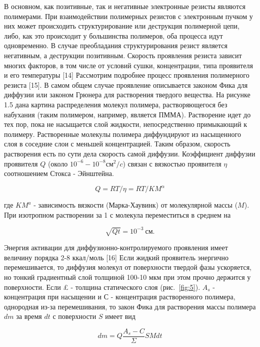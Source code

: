 В основном, как позитивные, так и негативные электронные резисты являются полимерами. При взаимодействии полимерных резистов с электронным пучком у них может происходить структурирование или деструкция полимерной цепи, либо, как это происходит у большинства полимеров, оба процесса идут одновременно. В случае преобладания структурирования резист является негативным, а деструкции позитивным. Скорость проявления резиста зависит многих факторов, в том числе от условий сушки, концентрации, типа проявителя и его температуры {[}14{]} Рассмотрим подробнее процесс проявления полимерного резиста {[}15{]}.   В самом общем случае проявление описывается законом Фика для диффузии или законом Грюнера для растворения твердого вещества. На рисунке 1.5 дана картина распределения молекул полимера, растворяющегося без набухания (таким полимером, например, является ПММА). Растворение идет до тех пор, пока не насыщается слой жидкости, непосредственно примыкающий к полимеру. Растворенные молекулы полимера диффундируют из насыщенного слоя в соседние слои с меньшей концентрацией. Таким образом, скорость растворения есть по сути дела скорость самой диффузии.
Коэффициент диффузии проявителя $Q$ (около $10^{-6}-10^{-8} см^2/c$) связан с вязкостью проявителя $\eta$ соотношением Стокса - Эйнштейна.

\begin{equation}
Q=RT/\eta=RT / KM^{\alpha}
\label{eq:A12}
\end{equation}

где $KM^a$ - зависимость вязкости (Марка-Хаувинк) от молекулярной массы ($M$). При изотропном растворении за 1 с молекула переместиться в среднем на 

\begin{equation}
\sqrt{Qt}=10^{-3}~\text{см}.
\label{eq:A13}
\end{equation}

Энергия активации для диффузионно-контролируемого проявления имеет величину порядка 2-8 ккал/моль {[}16{]}
Если жидкий проявитель энергично перемешивается, то диффузия молекул от поверхности твердой фазы ускоряется, но тонкий градиентный слой толщиной 100-10 мкм при этом прочно держится у поверхности. Если £ - толщина статического слоя (рис.~\ref{fig:5}). $A_s$ - концентрация при насыщении и $С$ - концентрация растворенного полимера, однородная из-за перемешивания, то закон Фика для растворения массы полимера $dm$ за время $dt$ с поверхности $S$ имеет вид

\begin{equation}
dm=Q\frac{A_s -C}{\Sigma} SMdt
\label{eq:A14}
\end{equation}

